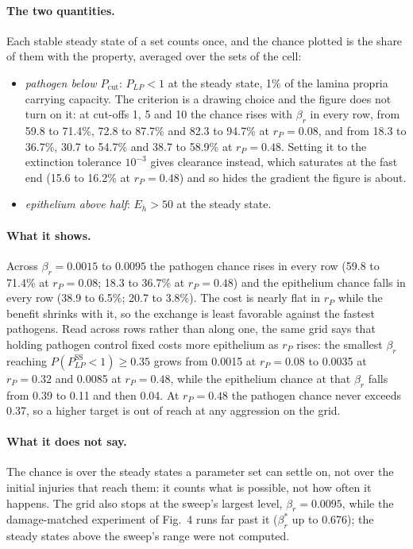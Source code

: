 \documentclass[11pt]{article}
\begin{document}
\paragraph{The two quantities.} Each stable steady state of a set counts once, and the chance
plotted is the share of them with the property, averaged over the sets of the cell:
\begin{itemize}
\item \emph{pathogen below $P_{\mathrm{cut}}$}: $P_{LP} < 1$ at the steady state, 1\% of the
  lamina propria carrying capacity. The criterion is a drawing choice and the figure does not
  turn on it: at cut-offs 1, 5 and 10 the chance rises with $\beta_r$ in every row, from
  59.8 to 71.4\%, 72.8 to 87.7\% and 82.3 to 94.7\% at $r_P = 0.08$, and from 18.3 to 36.7\%,
  30.7 to 54.7\% and 38.7 to 58.9\% at $r_P = 0.48$. Setting it to the extinction tolerance
  $10^{-3}$ gives clearance instead, which saturates at the fast end (15.6 to 16.2\% at
  $r_P = 0.48$) and so hides the gradient the figure is about.
\item \emph{epithelium above half}: $E_h > 50$ at the steady state.
\end{itemize}

\paragraph{What it shows.} Across $\beta_r = 0.0015$ to $0.0095$ the pathogen chance rises in
every row (59.8 to 71.4\% at $r_P = 0.08$; 18.3 to 36.7\% at $r_P = 0.48$) and the epithelium
chance falls in every row (38.9 to 6.5\%; 20.7 to 3.8\%). The cost is nearly flat in $r_P$
while the benefit shrinks with it, so the exchange is least favorable against the fastest
pathogens. Read across rows rather than along one, the same grid says that holding pathogen
control fixed costs more epithelium as $r_P$ rises: the smallest $\beta_r$ reaching
$P(P_{LP}^{\mathrm{SS}} < 1) \ge 0.35$ grows from 0.0015 at $r_P = 0.08$ to 0.0035 at
$r_P = 0.32$ and 0.0085 at $r_P = 0.48$, while the epithelium chance at that $\beta_r$ falls
from 0.39 to 0.11 and then 0.04. At $r_P = 0.48$ the pathogen chance never exceeds 0.37, so a
higher target is out of reach at any aggression on the grid.

\paragraph{What it does not say.} The chance is over the steady states a parameter set can
settle on, not over the initial injuries that reach them: it counts what is possible, not how
often it happens. The grid also stops at the sweep's largest level, $\beta_r = 0.0095$, while
the damage-matched experiment of Fig.~4 runs far past it ($\beta_r^{*}$ up to 0.676); the
steady states above the sweep's range were not computed.
\end{document}
